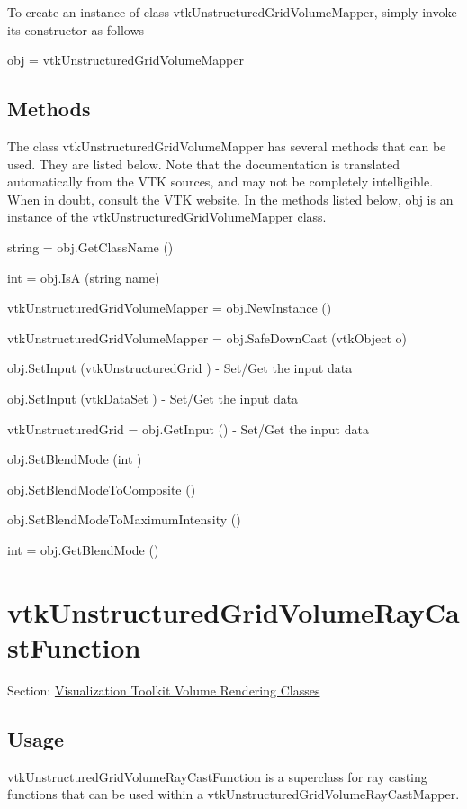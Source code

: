 To create an instance of class vtk\-Unstructured\-Grid\-Volume\-Mapper, simply invoke its constructor as follows \begin{DoxyVerb}  obj = vtkUnstructuredGridVolumeMapper
\end{DoxyVerb}
 \hypertarget{vtkwidgets_vtkxyplotwidget_Methods}{}\subsection{Methods}\label{vtkwidgets_vtkxyplotwidget_Methods}
The class vtk\-Unstructured\-Grid\-Volume\-Mapper has several methods that can be used. They are listed below. Note that the documentation is translated automatically from the V\-T\-K sources, and may not be completely intelligible. When in doubt, consult the V\-T\-K website. In the methods listed below, {\ttfamily obj} is an instance of the vtk\-Unstructured\-Grid\-Volume\-Mapper class. 
\begin{DoxyItemize}
\item {\ttfamily string = obj.\-Get\-Class\-Name ()}  
\item {\ttfamily int = obj.\-Is\-A (string name)}  
\item {\ttfamily vtk\-Unstructured\-Grid\-Volume\-Mapper = obj.\-New\-Instance ()}  
\item {\ttfamily vtk\-Unstructured\-Grid\-Volume\-Mapper = obj.\-Safe\-Down\-Cast (vtk\-Object o)}  
\item {\ttfamily obj.\-Set\-Input (vtk\-Unstructured\-Grid )} -\/ Set/\-Get the input data  
\item {\ttfamily obj.\-Set\-Input (vtk\-Data\-Set )} -\/ Set/\-Get the input data  
\item {\ttfamily vtk\-Unstructured\-Grid = obj.\-Get\-Input ()} -\/ Set/\-Get the input data  
\item {\ttfamily obj.\-Set\-Blend\-Mode (int )}  
\item {\ttfamily obj.\-Set\-Blend\-Mode\-To\-Composite ()}  
\item {\ttfamily obj.\-Set\-Blend\-Mode\-To\-Maximum\-Intensity ()}  
\item {\ttfamily int = obj.\-Get\-Blend\-Mode ()}  
\end{DoxyItemize}\hypertarget{vtkvolumerendering_vtkunstructuredgridvolumeraycastfunction}{}\section{vtk\-Unstructured\-Grid\-Volume\-Ray\-Cast\-Function}\label{vtkvolumerendering_vtkunstructuredgridvolumeraycastfunction}
Section\-: \hyperlink{sec_vtkvolumerendering}{Visualization Toolkit Volume Rendering Classes} \hypertarget{vtkwidgets_vtkxyplotwidget_Usage}{}\subsection{Usage}\label{vtkwidgets_vtkxyplotwidget_Usage}
vtk\-Unstructured\-Grid\-Volume\-Ray\-Cast\-Function is a superclass for ray casting functions that can be used within a vtk\-Unstructured\-Grid\-Volume\-Ray\-Cast\-Mapper.

